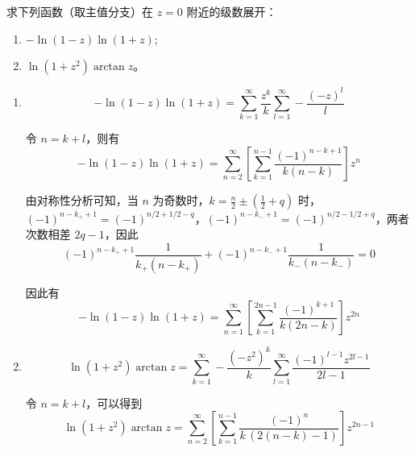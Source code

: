 \begin{question}
求下列函数（取主值分支）在 \(z=0\) 附近的级数展开：
\begin{enumerate}
  \item \(-\ln(1-z) \ln(1+z)\);

  \item \(\ln(1+z^2) \arctan z\)。
\end{enumerate}
\begin{solution}
\begin{enumerate}
  \item
\[
-\ln(1-z) \ln(1+z) = \sum_{k=1}^\infty \frac{z^k}{k} \sum_{l=1}^\infty -\frac{(-z)^l}{l}
\]

令 \(n = k+l\)，则有
\[
-\ln(1-z) \ln(1+z) = \sum_{n=2}^\infty \left[\sum_{k=1}^{n-1} \frac{(-1)^{n-k+1}}{k(n-k)}\right] z^n
\]

由对称性分析可知，当 \(n\) 为奇数时，\(k=\frac{n}{2} \pm (\frac12 + q)\) 时，\((-1)^{n-k_++1}=(-1)^{n/2+1/2-q}\)，\((-1)^{n-k_-+1}=(-1)^{n/2-1/2+q}\)，两者次数相差 \(2q-1\)，因此
\[
(-1)^{n-k_++1} \frac{1}{k_+(n-k_+)} + (-1)^{n-k_-+1} \frac{1}{k_-(n-k_-)} = 0
\]

因此有
\[
-\ln(1-z) \ln(1+z) = \sum_{n=1}^\infty \left[\sum_{k=1}^{2n-1} \frac{(-1)^{k+1}}{k(2n-k)}\right] z^{2n}
\]

  \item
\[
\ln(1+z^2) \arctan z
= \sum_{k=1}^\infty -\frac{(-z^2)^k}{k} \sum_{l=1}^\infty \frac{(-1)^{l-1} z^{2l-1}}{2l-1}
\]

令 \(n = k+l\)，可以得到
\[
\ln(1+z^2) \arctan z
= \sum_{n=2}^\infty \left[\sum_{k=1}^{n-1} \frac{(-1)^n}{k\,(2(n-k)-1)}\right] z^{2n-1}
\]
\end{enumerate}
\end{solution}
\end{question}
